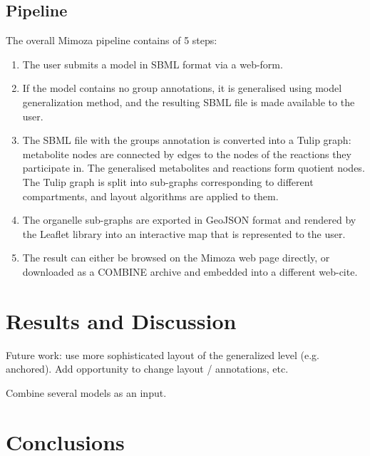 \documentclass{bmcart}
\begin{document}
 
\subsection*{Pipeline}
The overall Mimoza pipeline  contains of 5 steps:
\begin{enumerate}
\item The user submits a model in SBML format via a web-form.
\item If the model contains no group annotations, it is generalised using model generalization method, and the resulting SBML file is made available to the user.
\item The SBML file with the groups annotation is converted into a Tulip graph: metabolite nodes are connected by edges to the nodes of the reactions they participate in. The generalised metabolites and reactions form quotient nodes. The Tulip graph is split into sub-graphs corresponding to different compartments, and layout algorithms are applied to them.
\item The organelle sub-graphs are exported in GeoJSON format and rendered by the Leaflet library into an interactive map that is represented to the user.
\item The result can either be browsed on the Mimoza web page directly, or downloaded as a COMBINE archive and embedded into a different web-cite.
\end{enumerate}


\section*{Results and Discussion}

Future work: use more sophisticated layout of the generalized level (e.g. anchored).
Add opportunity to change layout / annotations, etc.

Combine several models as an input.

\section*{Conclusions}
\end{document}
